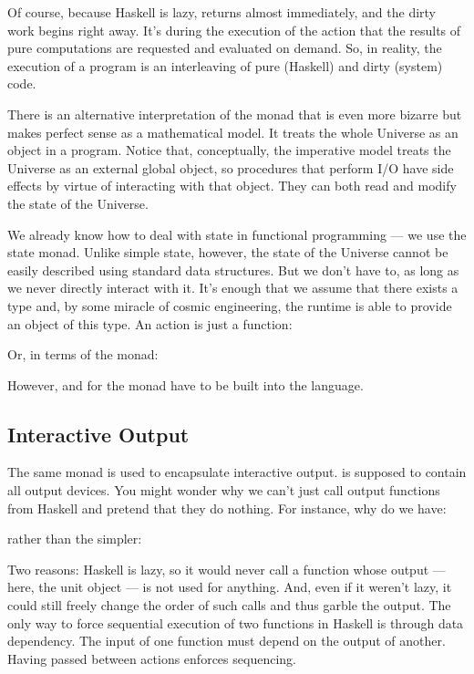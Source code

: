 Of course, because Haskell is lazy,  returns almost
immediately, and the dirty work begins right away. It's during the
execution of the  action that the results of pure
computations are requested and evaluated on demand. So, in reality, the
execution of a program is an interleaving of pure (Haskell) and dirty
(system) code.

There is an alternative interpretation of the  monad that is
even more bizarre but makes perfect sense as a mathematical model. It
treats the whole Universe as an object in a program. Notice that,
conceptually, the imperative model treats the Universe as an external
global object, so procedures that perform I/O have side effects by
virtue of interacting with that object. They can both read and modify
the state of the Universe.

We already know how to deal with state in functional programming --- we
use the state monad. Unlike simple state, however, the state of the
Universe cannot be easily described using standard data structures. But
we don't have to, as long as we never directly interact with it. It's
enough that we assume that there exists a type  and,
by some miracle of cosmic engineering, the runtime is able to provide an
object of this type. An  action is just a function:

Or, in terms of the  monad:

However, \code{>=>} and  for
the  monad have to be built into the language.

\subsection{Interactive Output}

The same  monad is used to encapsulate interactive output.
 is supposed to contain all output devices. You might
wonder why we can't just call output functions from Haskell and pretend
that they do nothing. For instance, why do we have:

rather than the simpler:

Two reasons: Haskell is lazy, so it would never call a function whose
output --- here, the unit object --- is not used for anything. And, even
if it weren't lazy, it could still freely change the order of such calls
and thus garble the output. The only way to force sequential execution
of two functions in Haskell is through data dependency. The input of one
function must depend on the output of another. Having 
passed between  actions enforces sequencing.

